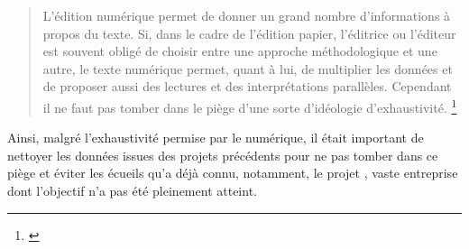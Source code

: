 \begin{quote}
    L’édition numérique permet de donner un grand nombre
d’informations à propos du texte. Si, dans le cadre de l’édition
papier, l’éditrice ou l’éditeur est souvent obligé de choisir
entre une approche méthodologique et une autre, le texte
numérique permet, quant à lui, de multiplier les données et de
proposer aussi des lectures et des interprétations parallèles.
Cependant il ne faut pas tomber dans le piège d’une sorte
d’idéologie d’exhaustivité. \footnote{\cite{vitali_rosati_les_2023}}
\end{quote}

Ainsi, malgré l'exhaustivité permise par le numérique, il était important de nettoyer les données issues des projets précédents pour ne pas tomber dans ce \og piège \fg et éviter les écueils qu'a déjà connu, notamment, le projet \LSC, vaste entreprise dont l'objectif n'a pas été pleinement atteint. 

